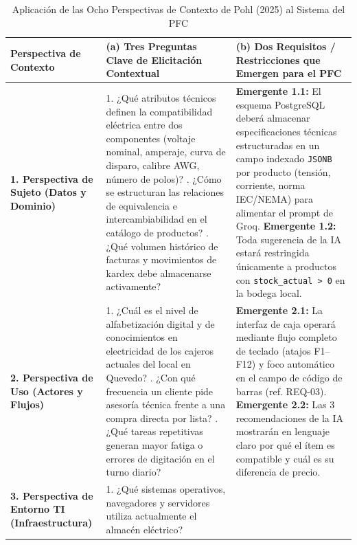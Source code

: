 \begin{table}[htbp]
\centering
\scriptsize
\caption{Aplicación de las Ocho Perspectivas de Contexto de Pohl (2025) \cite{pohl2025} al Sistema del PFC}
\label{tab:ocho_perspectivas}
\begin{tabularx}{\textwidth}{l Y Y}
\toprule
\textbf{Perspectiva de Contexto \cite{pohl2025}} & \textbf{(a) Tres Preguntas Clave de Elicitación Contextual} & \textbf{(b) Dos Requisitos / Restricciones que Emergen para el PFC} \\
\midrule
\textbf{1. Perspectiva de Sujeto (Datos y Dominio)} & 
1. ¿Qué atributos técnicos definen la compatibilidad eléctrica entre dos componentes (voltaje nominal, amperaje, curva de disparo, calibre AWG, número de polos)? . ¿Cómo se estructuran las relaciones de equivalencia e intercambiabilidad en el catálogo de productos? . ¿Qué volumen histórico de facturas y movimientos de kardex debe almacenarse activamente? & 
\textbf{Emergente 1.1:} El esquema PostgreSQL deberá almacenar especificaciones técnicas estructuradas en un campo indexado \texttt{JSONB} por producto (tensión, corriente, norma IEC/NEMA) para alimentar el prompt de Groq. \newline
\textbf{Emergente 1.2:} Toda sugerencia de la IA estará restringida únicamente a productos con \texttt{stock\_actual > 0} en la bodega local. \\
\midrule
\textbf{2. Perspectiva de Uso (Actores y Flujos)} & 
1. ¿Cuál es el nivel de alfabetización digital y de conocimientos en electricidad de los cajeros actuales del local en Quevedo? . ¿Con qué frecuencia un cliente pide asesoría técnica frente a una compra directa por lista? . ¿Qué tareas repetitivas generan mayor fatiga o errores de digitación en el turno diario? & 
\textbf{Emergente 2.1:} La interfaz de caja operará mediante flujo completo de teclado (atajos F1--F12) y foco automático en el campo de código de barras (ref. REQ-03). \newline
\textbf{Emergente 2.2:} Las 3 recomendaciones de la IA mostrarán en lenguaje claro por qué el ítem es compatible y cuál es su diferencia de precio. \\
\midrule
\textbf{3. Perspectiva de Entorno TI (Infraestructura)} & 
1. ¿Qué sistemas operativos, navegadores y servidores utiliza actualmente el almacén eléctrico? \newline

\end{tabularx}
\end{table}
